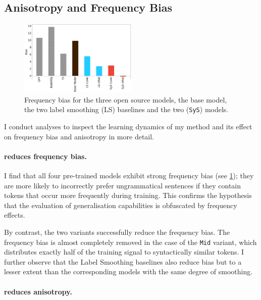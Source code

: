 \subsection{Anisotropy and Frequency Bias}

\begin{figure}
    \centering
    \includegraphics[width=0.5\textwidth]{chapters/syntatic-smoothing/figures/biases.png}
    \caption{Frequency bias for the three open source models, the base model, the two label smoothing (LS) baselines and the two \smoothing (\texttt{SyS}) models.}
    \label{fig:biases}
\end{figure}

I conduct analyses to inspect the learning dynamics of my method and its effect on frequency bias and anisotropy in more detail. 

\paragraph{\smoothing reduces frequency bias.}
I find that all four pre-trained models exhibit strong frequency bias (see \cref{fig:biases}); they are more likely to incorrectly prefer ungrammatical sentences if they contain tokens that occur more frequently during training. This confirms the hypothesis that the evaluation of generalisation capabilities is obfuscated by frequency effects. 

By contrast, the two \smoothing variants successfully reduce the frequency bias. The frequency bias is almost completely removed in the case of the \texttt{Mid} variant, which distributes exactly half of the training signal to syntactically similar tokens. I further observe that the Label Smoothing baselines also reduce bias but to a lesser extent than the corresponding \smoothing models with the same degree of smoothing. 


\paragraph{\smoothing reduces anisotropy.}

